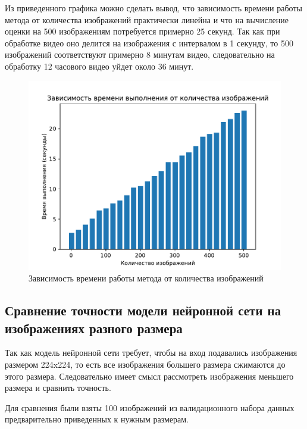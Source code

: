 Из приведенного графика можно сделать вывод, что зависимость времени работы метода от количества изображений практически линейна и что на вычисление оценки на 500 изображениям потребуется примерно 25 секунд. Так как при обработке видео оно делится на изображения с интервалом в 1 секунду, то 500 изображений соответствуют примерно 8 минутам видео, следовательно на обработку 12 часового видео уйдет около 36 минут.

\begin{figure}[H]
	\centering
	\includegraphics[scale=0.8]{img/count_time_bench.pdf}
	\caption{Зависимость времени работы метода от количества изображений}
	\label{fig:count_time_bench}
\end{figure}

\subsection{Сравнение точности модели нейронной сети на изображениях разного размера}
Так как модель нейронной сети требует, чтобы на вход подавались изображения размером 224x224, то есть все изображения большего размера сжимаются до этого размера. Следовательно имеет смысл рассмотреть изображения меньшего размера и сравнить точность.
 
Для сравнения были взяты 100 изображений из валидационного набора данных предварительно приведенных к нужным размерам.

